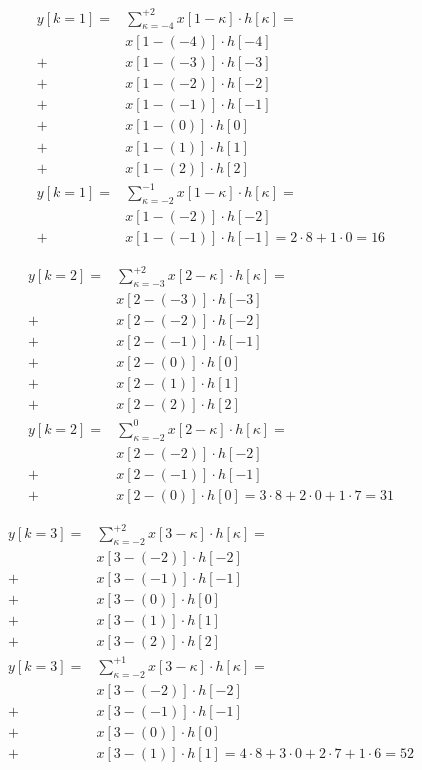 \clearpage
\begin{align}
y[k=1] = &\sum\limits_{\kappa = -4}^{+2} x[1 -\kappa] \cdot h[\kappa] =\\
&x[1 -(-4)] \cdot h[-4]\nonumber\\
+&x[1 -(-3)] \cdot h[-3]\nonumber\\
+&x[1 -(-2)] \cdot h[-2]\nonumber\\
+&x[1 -(-1)] \cdot h[-1]\nonumber\\
+&x[1 -(0)] \cdot h[0]\nonumber\\
+&x[1 -(1)] \cdot h[1]\nonumber\\
+&x[1 -(2)] \cdot h[2]\nonumber\\
y[k=1] = & \sum\limits_{\kappa = -2}^{-1} x[1 -\kappa] \cdot h[\kappa] =\nonumber\\
&x[1 -(-2)] \cdot h[-2]\nonumber\\
+&x[1 -(-1)] \cdot h[-1] = 2\cdot 8 + 1\cdot 0 = 16\nonumber
\end{align}

\begin{align}
y[k=2] =& \sum\limits_{\kappa = -3}^{+2} x[2 -\kappa] \cdot h[\kappa] =\\
&x[2 -(-3)] \cdot h[-3]\nonumber\\
+&x[2 -(-2)] \cdot h[-2]\nonumber\\
+&x[2 -(-1)] \cdot h[-1]\nonumber\\
+&x[2 -(0)] \cdot h[0]\nonumber\\
+&x[2 -(1)] \cdot h[1]\nonumber\\
+&x[2 -(2)] \cdot h[2]\nonumber\\
y[k=2] = & \sum\limits_{\kappa = -2}^{0} x[2 -\kappa] \cdot h[\kappa] =\nonumber\\
&x[2 -(-2)] \cdot h[-2]\nonumber\\
+&x[2 -(-1)] \cdot h[-1]\nonumber\\
+&x[2 -(0)] \cdot h[0] = 3\cdot 8 + 2\cdot 0 + 1\cdot 7 = 31\nonumber
\end{align}

\clearpage
\begin{align}
y[k=3] = & \sum\limits_{\kappa = -2}^{+2} x[3 -\kappa] \cdot h[\kappa] =\\
&x[3 -(-2)] \cdot h[-2]\nonumber\\
+&x[3 -(-1)] \cdot h[-1]\nonumber\\
+&x[3 -(0)] \cdot h[0]\nonumber\\
+&x[3 -(1)] \cdot h[1]\nonumber\\
+&x[3 -(2)] \cdot h[2]\nonumber\\
y[k=3] = & \sum\limits_{\kappa = -2}^{+1} x[3 -\kappa] \cdot h[\kappa] =\nonumber\\
&x[3 -(-2)] \cdot h[-2]\nonumber\\
+&x[3 -(-1)] \cdot h[-1]\nonumber\\
+&x[3 -(0)] \cdot h[0]\nonumber\\
+&x[3 -(1)] \cdot h[1] = 4\cdot 8 + 3\cdot 0 + 2\cdot 7 + 1\cdot 6 = 52\nonumber
\end{align}

